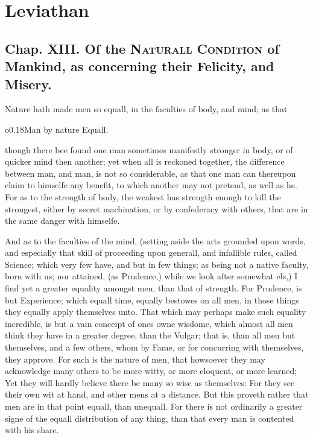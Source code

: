 
\author{Thomas Hobbes}
\chapter[Leviathan, chaps. 13 and 17]{Leviathan}

\section*{Chap. XIII. Of the \textsc{Naturall Condition} of
Mankind, as concerning their Felicity, and Misery.}


Nature hath made men so equall, in the faculties of body, and mind; as
that \begin{wrapfigure}[4]{o}{0.18\textwidth}\wrapadj Man by nature
Equall. \end{wrapfigure} though there bee found one man sometimes
manifestly stronger in body, or of quicker mind then another; yet when
all is reckoned together, the difference between man, and man, is not
so considerable, as that one man can thereupon claim to himselfe any
benefit, to which another may not pretend, as well as he. For as to
the strength of body, the weakest has strength enough to kill the
strongest, either by secret machination, or by confederacy with
others, that are in the same danger with himselfe.

And as to the faculties of the mind, (setting aside the arts
grounded upon words, and especially that skill of proceeding upon
generall, and infallible rules, called Science; which very few have,
and but in few things; as being not a native faculty, born with us;
nor attained, (as Prudence,) while we look after somewhat els,) I find
yet a greater equality amongst men, than that of strength. For
Prudence, is but Experience; which equall time, equally bestowes on
all men, in those things they equally apply themselves unto. That
which may perhaps make such equality incredible, is but a vain
conceipt of ones owne wisdome, which almost all men think they have
in a greater degree, than the Vulgar; that is, than all men but
themselves, and a few others, whom by Fame, or for concurring with
themselves, they approve. For such is the nature of men, that
howsoever they may acknowledge many others to be more witty, or more
eloquent, or more learned; Yet they will hardly believe there be many
so wise as themselves: For they see their own wit at hand, and other
mens at a distance. But this proveth rather that men are in that
point equall, than unequall. For there is not ordinarily a greater
signe of the equall distribution of any thing, than that every man is
contented with his share.

